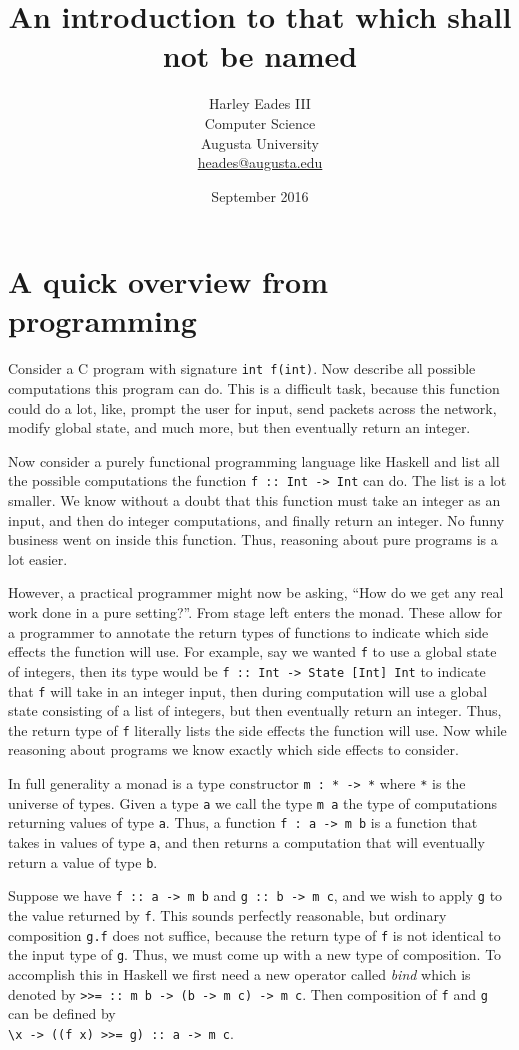 \documentclass{article}
\title{An introduction to that which shall not be named}
\author{Harley Eades III\\Computer Science\\Augusta University\\\href{mailto:heades@augusta.edu}{heades@augusta.edu}}
\date{September 2016}
\begin{document}
\maketitle

\section{A quick overview from programming}
\label{sec:a_quick_example_from_programming}
Consider a C program with signature \verb!int f(int)!.  Now describe
all possible computations this program can do.  This is a difficult
task, because this function could do a lot, like, prompt the user for
input, send packets across the network, modify global state, and much
more, but then eventually return an integer.

Now consider a purely functional programming language like Haskell
\cite{Haskell} and list all the possible computations the function
\verb!f :: Int -> Int! can do. The list is a lot smaller.  We know
without a doubt that this function must take an integer as an input,
and then do integer computations, and finally return an integer.  No
funny business went on inside this function.  Thus, reasoning about
pure programs is a lot easier.

However, a practical programmer might now be asking, ``How do we get
any real work done in a pure setting?''.  From stage left enters the
monad.  These allow for a programmer to annotate the return types of
functions to indicate which side effects the function will use.  For
example, say we wanted \verb!f! to use a global state of integers,
then its type would be \verb!f :: Int -> State [Int] Int! to indicate
that \verb!f! will take in an integer input, then during computation
will use a global state consisting of a list of integers, but then
eventually return an integer.  Thus, the return type of \verb!f!
  literally lists the side effects the function will use.  Now while
  reasoning about programs we know exactly which side effects to
  consider.

In full generality a monad is a type constructor \verb!m : * -> *!
where \verb!*! is the universe of types.  Given a type \verb!a! we
call the type \verb!m a! the type of computations returning values
of type \verb!a!.  Thus, a function \verb!f : a -> m b! is a function that
takes in values of type \verb!a!, and then returns a computation that
will eventually return a value of type \verb!b!.

Suppose we have \verb!f :: a -> m b! and \verb!g :: b -> m c!, and we
wish to apply \verb!g! to the value returned by \verb!f!. This sounds
perfectly reasonable, but ordinary composition \verb!g.f! does not
suffice, because the return type of \verb!f! is not identical to the
input type of \verb!g!.  Thus, we must come up with a new type of
composition.  To accomplish this in Haskell we first need a new
operator called \textit{bind} which is denoted by
\verb!>>= :: m b -> (b -> m c) -> m c!.  Then composition of \verb!f!
and \verb!g! can be defined by\\
\verb!\x -> ((f x) >>= g) :: a -> m c!.
\end{document}
